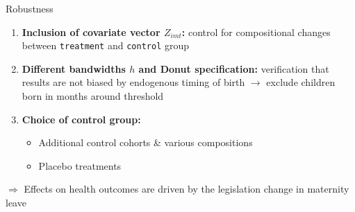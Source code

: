 \documentclass[handout]{beamer} %
\begin{document}
\begin{frame}{Robustness}

\begin{enumerate}
\item \textbf{Inclusion of covariate vector $Z_{imt}$:} control for compositional changes between \texttt{treatment} and \texttt{control} group 
\item \textbf{Different bandwidths $h$ and Donut specification:} verification that results are not biased by endogenous timing of birth $\rightarrow$ exclude children born in months around threshold
\item \textbf{Choice of control group:} 
\begin{itemize}
\item Additional control cohorts \& various compositions
\item Placebo treatments
\end{itemize}
\end{enumerate}

$\Rightarrow$ Effects on health outcomes are driven by the legislation change in maternity leave

\end{frame}




\end{document}
